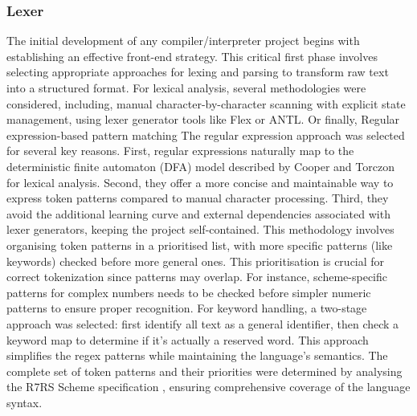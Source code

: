 \documentclass[final]{cmpreport_02}
\begin{document}
\subsubsection{Lexer}
The initial development of any compiler/interpreter project begins with establishing an effective front-end strategy. This critical first phase involves selecting appropriate approaches for lexing and parsing to transform raw text into a structured format.
For lexical analysis, several methodologies were considered, including, manual character-by-character scanning with explicit state management, using lexer generator tools like Flex or ANTL. Or finally, Regular expression-based pattern matching
The regular expression approach was selected for several key reasons. 
First, regular expressions naturally map to the deterministic finite automaton (DFA) model described by Cooper and Torczon \cite{cooper2011engineering} for lexical analysis. Second, they offer a more concise and maintainable way to express token patterns compared to manual character processing. Third, they avoid the additional learning curve and external dependencies associated with lexer generators, keeping the project self-contained.
This methodology involves organising token patterns in a prioritised list, with more specific patterns (like keywords) checked before more general ones. This prioritisation is crucial for correct tokenization since patterns may overlap. For instance, scheme-specific patterns for complex numbers needs to be checked before simpler numeric patterns to ensure proper recognition.
For keyword handling, a two-stage approach was selected: first identify all text as a general identifier, then check a keyword map to determine if it's actually a reserved word. This approach simplifies the regex patterns while maintaining the language's semantics.
The complete set of token patterns and their priorities were determined by analysing the R7RS Scheme specification \cite{r7rs}, ensuring comprehensive coverage of the language syntax.
\end{document}
